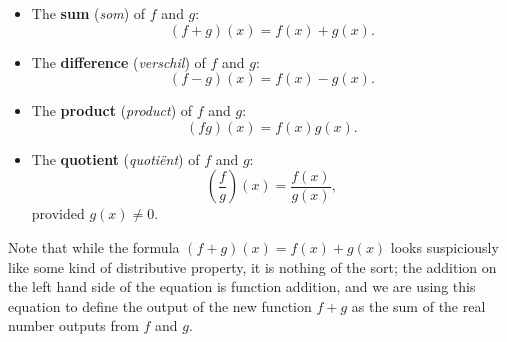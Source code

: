 \begin{itemize}

\item The \textbf{sum} (\textit{som}) of $f$ and $g$: 
 \[(f+g)(x) = f(x) + g(x).\]

\item  The \textbf{difference} (\textit{verschil}) of $f$ and $g$:  
 \[(f-g)(x) = f(x) - g(x).\]

\item  The \textbf{product} (\textit{product}) of $f$ and $g$:
 \[(fg)(x) = f(x)g(x).\]

\item  The \textbf{quotient} (\textit{quoti\"ent}) of $f$ and $g$:
\[\left(\dfrac{f}{g}\right)(x) = \dfrac{f(x)}{g(x)},\] provided $g(x) \neq 0$.

\end{itemize}
  Note that while the formula $(f+g)(x) = f(x) + g(x)$ looks suspiciously like some kind of distributive property, it is nothing of the sort;  the addition on the left hand side of the equation is function addition, and we are using this equation to define the output of the new function $f+g$ as the sum of the real number outputs from $f$ and $g$.

